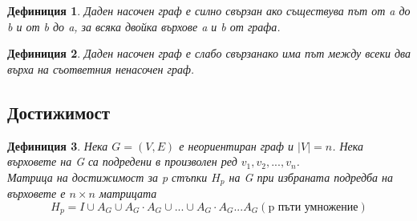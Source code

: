 \documentclass[fleqn, 12pt]{article}
\newtheorem{definition}{Дефиниция}[subsection]
\theoremstyle{definition}
\begin{document}
\begin{definition}
Даден насочен граф е силно свързан ако съществува път от a до b и от b до a, за всяка двойка върхове a и b от графа.
\end{definition}

\begin{definition}
Даден насочен граф е слабо свързанако има път между всеки два върха на съответния ненасочен граф.
\end{definition}

\subsection{Достижимост}
\begin{definition}
Нека $G = (V, E)$ е неориентиран граф и $\vert V \vert = n$. Нека върховете на G са подредени в произволен ред $v_1, v_2, ..., v_n$. \\
Матрица на достижимост за p стъпки $H_p$ на G при избраната подредба на върховете е $n\times n$ матрицата
$$H_p = I \cup A_G \cup A_G \cdot A_G \cup ... \cup A_G \cdot A_G ... A_G (\text{p пъти умножение})$$
\end{definition}
\end{document}
